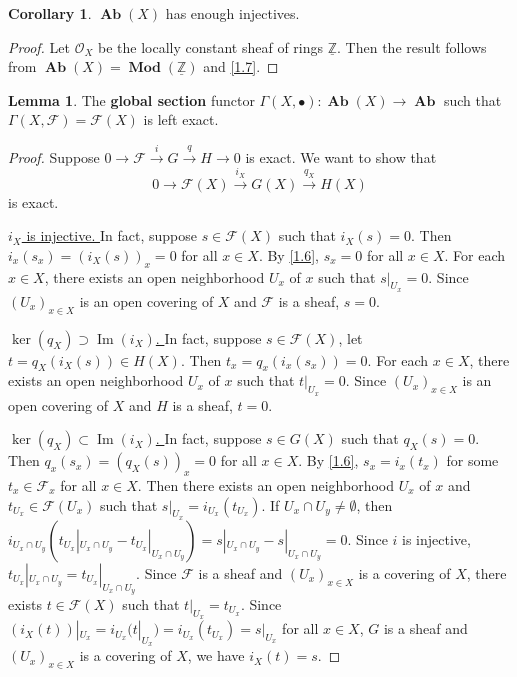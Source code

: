 \documentclass{amsart}
\numberwithin{equation}{section}
\theoremstyle{plain}
\theoremstyle{definition}
\newtheorem{lem}[equation]{Lemma}
\newtheorem{cor}[equation]{Corollary}
\DeclareMathOperator{\Ab}{\mathbf{Ab}}
\DeclareMathOperator{\Mod}{\mathbf{Mod}}
\DeclareMathOperator{\im}{Im}
\begin{document}
\begin{cor}\label{1.8}
	$ \Ab(X) $ has enough injectives.
\end{cor}

\begin{proof}
	Let $ \mathcal O_X $ be the locally constant sheaf of rings $ \underline{\mathbb Z} $. 
	Then the result follows from $ \Ab(X)=\Mod(\underline{\mathbb Z}) $ and \cref{1.7}. 
\end{proof}

\begin{lem}\label{1.9}
	The \textbf{global section} functor $ \Gamma(X, \bullet):\Ab(X)\to\Ab $ such that $ \Gamma(X,\mathscr F)=\mathscr F(X)$ is left exact. 
\end{lem}

\begin{proof}
	Suppose $ 0\to \mathscr F\xrightarrow{i} G\xrightarrow{q} H\to 0 $ is exact. 
	We want to show that $$ 0\to \mathscr F(X)\xrightarrow{i_X} G(X)\xrightarrow{q_X} H(X) $$ is exact.
	
	\underline{$ i_X$ is injective. }
	In fact, suppose $ s\in \mathscr F(X) $ such that $ i_X(s)=0 $. 
	Then $ i_x(s_x)=(i_X(s))_x=0 $ for all $ x\in X $. 
	By \cref{1.6}, $ s_x=0 $ for all $ x\in X $. 
	For each $ x\in X $, there exists an open neighborhood $ U_x $ of $ x $ such that $ s|_{U_x}=0 $. 
	Since $ (U_x)_{x\in X} $ is an open covering of $ X $ and $ \mathscr F $ is a sheaf, $ s=0 $. 
	
	\underline{$ \ker(q_X)\supset\im(i_X) $. }
	In fact, suppose $ s\in \mathscr F(X) $, let $ t=q_X(i_X(s))\in H(X)$. 
	Then $ t_x=q_x(i_x(s_x))=0$. 
	For each $ x\in X $, there exists an open neighborhood $ U_x $ of $ x $ such that $ t|_{U_x}=0 $. 
	Since $ (U_x)_{x\in X} $ is an open covering of $ X $ and $ H $ is a sheaf, $ t=0 $.  
	
	\underline{$ \ker(q_X)\subset\im(i_X) $. }
	In fact, suppose $ s\in G(X) $ such that $ q_X(s)=0 $. 
	Then $ q_x(s_x)=(q_X(s))_x=0 $ for all $ x\in X $. 
	By \cref{1.6}, $ s_x=i_x(t_x) $ for some $ t_x\in \mathscr F_x $ for all $ x\in X $. 
	Then there exists an open neighborhood $ U_x $ of $ x $ and $ t_{U_x}\in \mathscr F(U_x) $ such that $ s|_{U_x}=i_{U_x}(t_{U_x}) $. 
	If $ U_x\cap U_y\ne\emptyset $, then $ i_{U_x\cap U_y}(t_{U_x}|_{U_x\cap U_y}-t_{U_x}|_{U_x\cap U_y})=s|_{U_x\cap U_y}-s|_{U_x\cap U_y}=0 $. 
	Since $ i $ is injective, $ t_{U_x}|_{U_x\cap U_y}=t_{U_x}|_{U_x\cap U_y} $. 
	Since $ \mathscr F $ is a sheaf and $ (U_x)_{x\in X} $ is a covering of $ X $, there exists $ t\in \mathscr F(X) $ such that $ t|_{U_x}=t_{U_x} $. 
	Since $ (i_X(t))|_{U_x}=i_{U_x}(t|_{U_x})=i_{U_x}(t_{U_x})=s|_{U_x} $ for all $ x\in X $, $G $ is a sheaf and $ (U_x)_{x\in X} $ is a covering of $ X $, we have $ i_X(t)=s $. 	
\end{proof}
\end{document}
